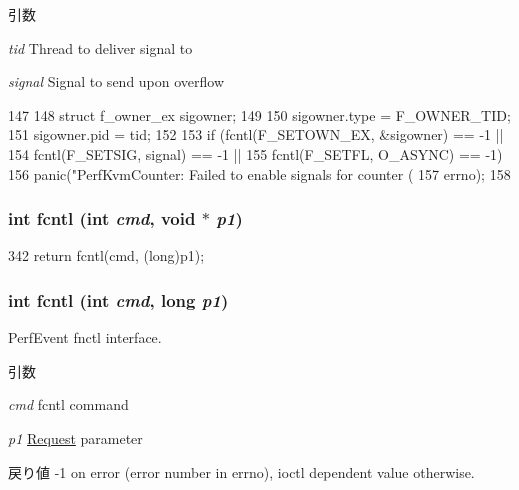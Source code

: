 \begin{DoxyParams}{引数}
\item[{\em tid}]Thread to deliver signal to \item[{\em signal}]Signal to send upon overflow \end{DoxyParams}



\begin{DoxyCode}
147 {
148     struct f_owner_ex sigowner;
149 
150     sigowner.type = F_OWNER_TID;
151     sigowner.pid = tid;
152 
153     if (fcntl(F_SETOWN_EX, &sigowner) == -1 ||
154         fcntl(F_SETSIG, signal) == -1 ||
155         fcntl(F_SETFL, O_ASYNC) == -1)
156         panic("PerfKvmCounter: Failed to enable signals for counter (%
157               errno);
158 }
\end{DoxyCode}
\hypertarget{classPerfKvmCounter_a801e1d8b832b7d2ea829411655d3d001}{
\subsubsection[{fcntl}]{\setlength{\rightskip}{0pt plus 5cm}int fcntl (int {\em cmd}, \/  void $\ast$ {\em p1})}}
\label{classPerfKvmCounter_a801e1d8b832b7d2ea829411655d3d001}



\begin{DoxyCode}
342 { return fcntl(cmd, (long)p1); }
\end{DoxyCode}
\hypertarget{classPerfKvmCounter_a59e734a4d9a204be38f0af7d82091648}{
\subsubsection[{fcntl}]{\setlength{\rightskip}{0pt plus 5cm}int fcntl (int {\em cmd}, \/  long {\em p1})}}
\label{classPerfKvmCounter_a59e734a4d9a204be38f0af7d82091648}
PerfEvent fnctl interface.


\begin{DoxyParams}{引数}
\item[{\em cmd}]fcntl command \item[{\em p1}]\hyperlink{classRequest}{Request} parameter\end{DoxyParams}
\begin{DoxyReturn}{戻り値}
-\/1 on error (error number in errno), ioctl dependent value otherwise. 
\end{DoxyReturn}



